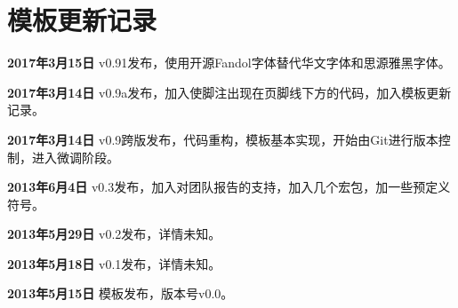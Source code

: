\chapter{模板更新记录}
\label{chap:updatelog}

\textbf{2017年3月15日} v0.91发布，使用开源Fandol字体替代华文字体和思源雅黑字体。

\textbf{2017年3月14日} v0.9a发布，加入使脚注出现在页脚线下方的代码，加入模板更新记录。

\textbf{2017年3月14日} v0.9跨版发布，代码重构，模板基本实现，开始由Git进行版本控制，进入微调阶段。

\textbf{2013年6月4日} v0.3发布，加入对团队报告的支持，加入几个宏包，加一些预定义符号。

\textbf{2013年5月29日} v0.2发布，详情未知。

\textbf{2013年5月18日} v0.1发布，详情未知。

\textbf{2013年5月15日} 模板发布，版本号v0.0。
